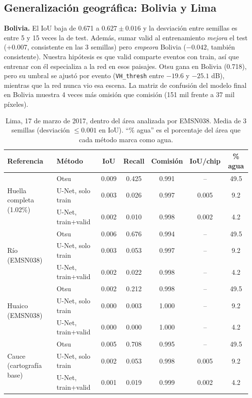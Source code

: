 \documentclass{article}
\begin{document}
\subsection{Generalización geográfica: Bolivia y Lima}

\textbf{Bolivia.} El IoU baja de 0.671 a $0.627 \pm 0.016$ y la desviación entre semillas es entre 5 y 15 veces la de test. Además, sumar valid al entrenamiento \emph{mejora} el test (+0.007, consistente en las 3 semillas) pero \emph{empeora} Bolivia ($-0.042$, también consistente). Nuestra hipótesis es que valid comparte eventos con train, así que entrenar con él especializa a la red en esos paisajes. Otsu gana en Bolivia (0.718), pero su umbral se ajustó por evento (\texttt{VH\_thresh} entre $-19.6$ y $-25.1$ dB), mientras que la red nunca vio esa escena. La matriz de confusión del modelo final en Bolivia muestra 4 veces más omisión que comisión (151 mil frente a 37 mil píxeles).

\begin{table}[t]
  \caption{Lima, 17 de marzo de 2017, dentro del área analizada por EMSN038. Media de 3 semillas (desviación $\leq 0.001$ en IoU). ``\% agua'' es el porcentaje del área que cada método marca como agua.}
  \label{tab:lima}
  \centering
  \small
  \begin{tabular}{llccccc}
    \toprule
    Referencia & Método & IoU & Recall & Comisión & IoU/chip & \% agua \\
    \midrule
    \multirow{3}{*}{Huella completa (1.02\%)} & Otsu & 0.009 & 0.425 & 0.991 & -- & 49.5 \\
     & U-Net, solo train & 0.003 & 0.026 & 0.997 & 0.005 & 9.2 \\
     & U-Net, train+valid & 0.002 & 0.010 & 0.998 & 0.002 & 4.2 \\
    \midrule
    \multirow{3}{*}{Río (EMSN038)} & Otsu & 0.006 & 0.676 & 0.994 & -- & 49.5 \\
     & U-Net, solo train & 0.003 & 0.053 & 0.997 & -- & 9.2 \\
     & U-Net, train+valid & 0.002 & 0.022 & 0.998 & -- & 4.2 \\
    \midrule
    \multirow{3}{*}{Huaico (EMSN038)} & Otsu & 0.002 & 0.212 & 0.998 & -- & 49.5 \\
     & U-Net, solo train & 0.000 & 0.003 & 1.000 & -- & 9.2 \\
     & U-Net, train+valid & 0.000 & 0.000 & 1.000 & -- & 4.2 \\
    \midrule
    \multirow{3}{*}{Cauce (cartografía base)} & Otsu & 0.005 & 0.708 & 0.995 & -- & 49.5 \\
     & U-Net, solo train & 0.002 & 0.053 & 0.998 & 0.005 & 9.2 \\
     & U-Net, train+valid & 0.001 & 0.019 & 0.999 & 0.002 & 4.2 \\
    \bottomrule
  \end{tabular}
\end{table}
\end{document}
